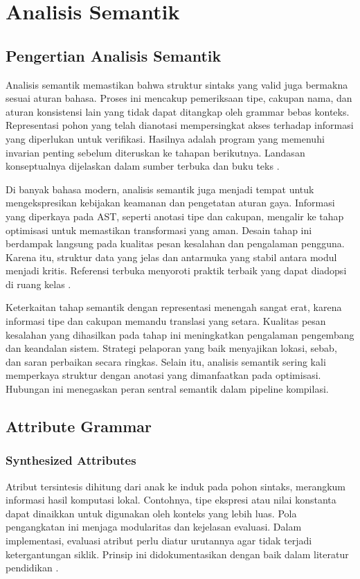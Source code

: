 \documentclass[../main.tex]{subfiles}
\begin{document}
\chapter{Analisis Semantik}

\section{Pengertian Analisis Semantik}
Analisis semantik memastikan bahwa struktur sintaks yang valid juga bermakna sesuai aturan bahasa. Proses ini mencakup pemeriksaan tipe, cakupan nama, dan aturan konsistensi lain yang tidak dapat ditangkap oleh grammar bebas konteks. Representasi pohon yang telah dianotasi mempersingkat akses terhadap informasi yang diperlukan untuk verifikasi. Hasilnya adalah program yang memenuhi invarian penting sebelum diteruskan ke tahapan berikutnya. Landasan konseptualnya dijelaskan dalam sumber terbuka dan buku teks \citep{Mogensen2010,Wirth1996}.

Di banyak bahasa modern, analisis semantik juga menjadi tempat untuk mengekspresikan kebijakan keamanan dan pengetatan aturan gaya. Informasi yang diperkaya pada AST, seperti anotasi tipe dan cakupan, mengalir ke tahap optimisasi untuk memastikan transformasi yang aman. Desain tahap ini berdampak langsung pada kualitas pesan kesalahan dan pengalaman pengguna. Karena itu, struktur data yang jelas dan antarmuka yang stabil antara modul menjadi kritis. Referensi terbuka menyoroti praktik terbaik yang dapat diadopsi di ruang kelas \citep{CS143}.

Keterkaitan tahap semantik dengan representasi menengah sangat erat, karena informasi tipe dan cakupan memandu translasi yang setara. Kualitas pesan kesalahan yang dihasilkan pada tahap ini meningkatkan pengalaman pengembang dan keandalan sistem. Strategi pelaporan yang baik menyajikan lokasi, sebab, dan saran perbaikan secara ringkas. Selain itu, analisis semantik sering kali memperkaya struktur dengan anotasi yang dimanfaatkan pada optimisasi. Hubungan ini menegaskan peran sentral semantik dalam pipeline kompilasi.

\section{Attribute Grammar}
\subsection{Synthesized Attributes}
Atribut tersintesis dihitung dari anak ke induk pada pohon sintaks, merangkum informasi hasil komputasi lokal. Contohnya, tipe ekspresi atau nilai konstanta dapat dinaikkan untuk digunakan oleh konteks yang lebih luas. Pola pengangkatan ini menjaga modularitas dan kejelasan evaluasi. Dalam implementasi, evaluasi atribut perlu diatur urutannya agar tidak terjadi ketergantungan siklik. Prinsip ini didokumentasikan dengan baik dalam literatur pendidikan \citep{WikiAttributeGrammar}.
\end{document}
